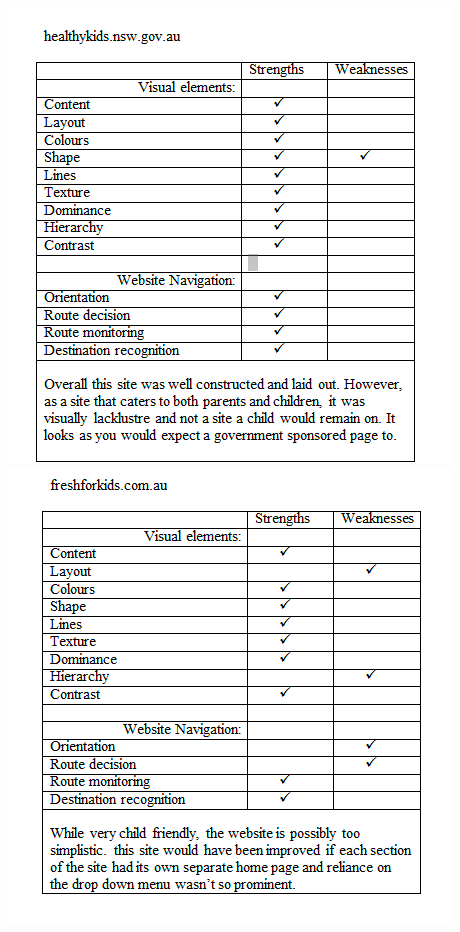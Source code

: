 \documentclass[letterpaper,twoside,12pt]{article}
\begin{document}
\includegraphics{assets/jpg/tab1}
\includegraphics{assets/jpg/tab2}
\end{document}
